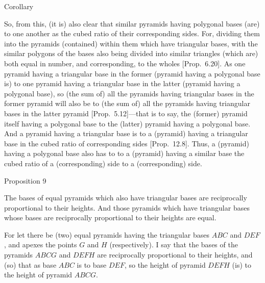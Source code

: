  \begin{center}
 \large{Corollary}
 \end{center}
 
 So, from this, (it is) also clear that similar pyramids  having polygonal bases (are) to one another as the cubed
 ratio of their corresponding sides. For, dividing them into  the pyramids (contained) within them which have triangular bases, with 
 the similar  polygons of the bases also being divided into similar triangles (which are) both equal in number, and corresponding,  to the wholes
 [Prop.~6.20].
 As  one pyramid having a triangular base in the former (pyramid having a polygonal base is)  to  one pyramid 
 having a triangular  base  in the latter (pyramid having a polygonal base),  so  (the sum of) all the pyramids having triangular bases in  the former pyramid will also
 be to (the sum of) all the pyramids having triangular bases in the latter  pyramid [Prop.~5.12]---that is to say, the (former) pyramid itself
 having  a polygonal base to the (latter) pyramid having a polygonal base. And a pyramid having a triangular base is to a (pyramid) having a triangular base in the cubed ratio of
 corresponding sides [Prop.~12.8]. Thus, a (pyramid) having a polygonal base also has to  to a (pyramid) having a similar base
 the
 cubed ratio of a (corresponding) side to a (corresponding) side.
 

\begin{center}
{\large Proposition 9}
\end{center}

The bases of equal pyramids which also have triangular bases are reciprocally
proportional to their heights. And those pyramids which have triangular bases whose bases are reciprocally
proportional to their heights  are equal.

\epsfysize=2.5in
\centerline{}

For let there be (two) equal pyramids having the triangular bases $ABC$ and $DEF$, and apexes
the points $G$ and $H$ (respectively). I say that the bases of the pyramids $ABCG$ and
$DEFH$ are reciprocally proportional to their heights, and (so) that as base $ABC$ is to base
$DEF$, so the height of pyramid $DEFH$ (is) to the height of pyramid $ABCG$.

